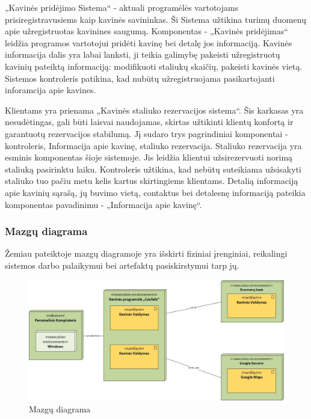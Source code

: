 \documentclass{VUMIFPSkursinis}
\begin{document}
{{{{{„Kavinės pridėjimo Sistema“ - aktuali programėlės vartotojams prisiregistravusiems kaip kavinės savininkas. Ši Sistema užtikina turimų duomenų apie užregistruotas kavinines saugumą. Komponentas - „Kavinės pridėjimas“ leidžia programos vartotojui pridėti kavinę bei detalę jos informaciją. Kavinės informacija dalis yra labai lanksti, ji teikia galimybę pakeisti užregistruotų kavinių pateiktą informaciją: modifikuoti staliukų skaičių, pakeisti kavinės vietą. Sistemos kontroleris patikina, kad nubūtų užregistruojama pasikartojanti inforamcija apie kavines.

Klientams yra prienama „Kavinės staliuko rezervacijos sistema“. Šis karkasas yra nesudėtingas, gali būti laisvai naudojamas, skirtas užtikinti klientų konfortą ir garantuotų rezervacijos stabilumą. Jį sudaro trys pagrindiniai komponentai - kontroleris, Informacija apie kavinę, staliuko rezervacija. Staliuko rezervacija yra esminis komponentas šioje sistemoje. Jis leidžia klientui užsirezervuoti norimą staliuką pasirinktu laiku. Kontroleris užtikina, kad nebūtų suteikiama užsisakyti staliuko tuo pačiu metu kelis kartus skirtingiems klientams. Detalią informaciją apie kavinių sąrašą, jų buvimo vietą, contaktus bei detalesnę informaciją pateikia komponentas pavadinimu - „Informacija apie kavinę“.  


\subsubsection{Mazgų diagrama}

Žemiau pateiktoje mazgų diagramoje yra išskirti fiziniai įrenginiai, reikalingi sistemos darbo palaikymui bei artefaktų pasiskirstymui tarp jų.
\begin{figure}[H]
    \centering
    \includegraphics[width=\textwidth,height=\textheight,keepaspectratio]{img/Deployment_diagram2} 
    \caption{Mazgų diagrama}
    \label{img:Model}
\end{figure}


}}}}}
\end{document}
